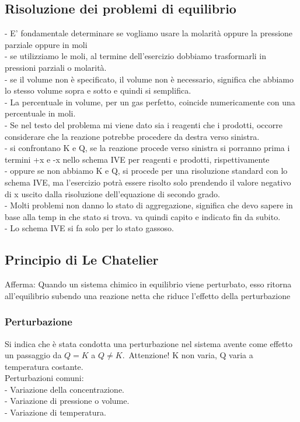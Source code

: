\subsection{Risoluzione dei problemi di equilibrio}
\tab- E’ fondamentale determinare se vogliamo usare la molarità oppure la pressione parziale oppure in moli\\
\tab\tab- se utilizziamo le moli, al termine dell’esercizio dobbiamo trasformarli in pressioni parziali o molarità.\\
\tab\tab- se il volume non è specificato, il volume non è necessario, significa che abbiamo lo stesso volume sopra e sotto e quindi si semplifica. \\
\tab- La percentuale in volume, per un gas perfetto, coincide numericamente con una percentuale in moli.\\
\tab- Se nel testo del problema mi viene dato sia i reagenti che i prodotti, occorre considerare che la reazione potrebbe procedere da destra verso sinistra. \\
\tab\tab- si confrontano K e Q, se la reazione procede verso sinistra si porranno prima i termini +x e -x nello schema IVE per reagenti e prodotti, rispettivamente\\
\tab\tab- oppure se non abbiamo K e Q, si procede per una risoluzione standard con  lo schema IVE, ma l’esercizio potrà essere risolto solo prendendo il valore negativo di x uscito dalla risoluzione dell’equazione di secondo grado. \\
\tab- Molti problemi non danno lo stato di aggregazione, significa che devo sapere in base alla temp in che stato si trova. va quindi capito e indicato fin da subito. \\
\tab\tab- Lo schema IVE si fa solo per lo stato gassoso.
\subsection{Principio di Le Chatelier}
Afferma: Quando un sistema chimico in equilibrio viene perturbato, esso ritorna all'equilibrio subendo una reazione netta che riduce l'effetto della perturbazione
\subsubsection{Perturbazione}
Si indica che è stata condotta una perturbazione nel sistema avente come effetto un passaggio da $Q = K$ a $Q \ne K$.\
Attenzione! K non varia, Q varia a temperatura costante.\\
Perturbazioni comuni:\\
\tab- Variazione della concentrazione.\\
\tab- Variazione di pressione o volume.\\ 
\tab- Variazione di temperatura.\\\\
